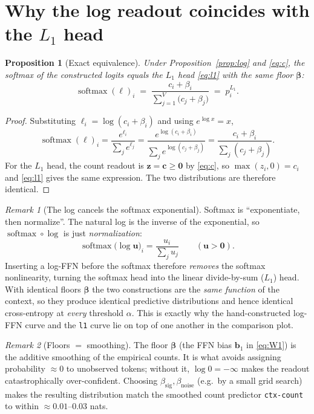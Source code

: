 \documentclass[11pt]{article}
\newtheorem{proposition}{Proposition}
\theoremstyle{remark}
\newtheorem{remark}{Remark}
\newcommand{\sm}{\operatorname{softmax}}
\newcommand{\ve}[1]{\bm{#1}}
\begin{document}
\section{Why the log readout coincides with the $L_1$ head}

\begin{proposition}[Exact equivalence]\label{prop:equiv}
Under Proposition~\ref{prop:log} and \eqref{eq:c}, the softmax of the constructed logits
equals the $L_1$ head \eqref{eq:l1} with the same floor $\ve\beta$:
\[
\sm(\ve\ell)_i
\;=\; \frac{c_i+\beta_i}{\sum_{j=1}^{V}\big(c_j+\beta_j\big)}
\;=\; p^{L_1}_i .
\]
\end{proposition}
\begin{proof}
Substituting $\ell_i=\log(c_i+\beta_i)$ and using $e^{\log x}=x$,
\[
\sm(\ve\ell)_i
=\frac{e^{\ell_i}}{\sum_j e^{\ell_j}}
=\frac{e^{\log(c_i+\beta_i)}}{\sum_j e^{\log(c_j+\beta_j)}}
=\frac{c_i+\beta_i}{\sum_j (c_j+\beta_j)} .
\]
For the $L_1$ head, the count readout is $\ve z=\ve c\ge\ve0$ by \eqref{eq:c}, so
$\max(z_i,0)=c_i$ and \eqref{eq:l1} gives the same expression. The two distributions
are therefore identical.
\end{proof}

\begin{remark}[The log cancels the softmax exponential]
Softmax is ``exponentiate, then normalize''. The natural log is the inverse of the
exponential, so $\sm\circ\log$ is just \emph{normalization}:
\[
\sm\!\big(\log \ve u\big)_i=\frac{u_i}{\sum_j u_j}\qquad(\ve u>\ve0).
\]
Inserting a log-FFN before the softmax therefore \emph{removes} the softmax
nonlinearity, turning the softmax head into the linear divide-by-sum ($L_1$) head. With
identical floors $\ve\beta$ the two constructions are the \emph{same function} of the
context, so they produce identical predictive distributions and hence identical
cross-entropy at \emph{every} threshold $\alpha$. This is exactly why the
hand-constructed log-FFN curve and the \texttt{l1} curve lie on top of one another in the
comparison plot.
\end{remark}

\begin{remark}[Floors $=$ smoothing]
The floor $\ve\beta$ (the FFN bias $\ve b_1$ in \eqref{eq:W1}) is the additive smoothing
of the empirical counts. It is what avoids assigning probability $\approx 0$ to
unobserved tokens; without it, $\log 0=-\infty$ makes the readout catastrophically
over-confident. Choosing $\beta_{\mathrm{sig}},\beta_{\mathrm{noise}}$ (e.g.\ by a small
grid search) makes the resulting distribution match the smoothed count predictor
\texttt{ctx-count} to within $\approx 0.01$--$0.03$ nats.
\end{remark}
\end{document}
